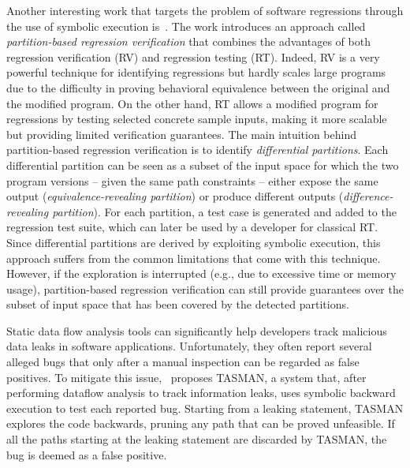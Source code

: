 Another interesting work that targets the problem of software regressions through the use of symbolic execution is~\cite{BOR-ICSE13}. The work introduces an approach called {\em partition-based regression verification} that combines the advantages of both regression verification (RV) and regression testing (RT). Indeed, RV is a very powerful technique for identifying regressions but hardly scales  large programs due to the difficulty in proving behavioral equivalence between the original and the modified program. On the other hand, RT allows  a modified program for regressions by testing selected concrete sample inputs, making it more scalable but providing limited verification guarantees. The main intuition behind partition-based regression verification is to identify {\em differential partitions}. Each differential partition can be seen as a subset of the input space for which the two program versions -- given the same path constraints -- either expose the same output ({\em equivalence-revealing partition}) or produce different outputs ({\em difference-revealing partition}). For each partition, a test case is generated and added to the regression test suite, which can later be used by a developer for classical RT. Since differential partitions are derived by exploiting symbolic execution, this approach suffers from the common limitations that come with this technique. However, if the exploration is interrupted (e.g., due to excessive time or memory usage), partition-based regression verification can still provide guarantees over the subset of input space that has been covered by the detected partitions.

Static data flow analysis tools can significantly help developers track malicious data leaks in software applications. Unfortunately, they often report several alleged bugs that only after a manual inspection can be regarded as false positives. To mitigate this issue,~\cite{ARH-SOAP15} proposes TASMAN, a system that, after performing dataflow analysis to track information leaks, uses symbolic backward execution to test each reported bug. Starting from a leaking statement, TASMAN explores the code backwards, pruning any path that can be proved unfeasible. If all the paths starting at the leaking statement are discarded by TASMAN, the bug is deemed as a false positive.

